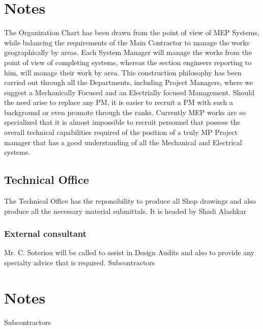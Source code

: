 \documentclass{article}
\begin{document}
\begin{minipage}[t]{.27\textwidth}
\section{Notes}

The Organization Chart has been drawn from the point of view of MEP Systems, while balancing the requirements of the Main Contractor to manage the works geographically by areas. Each System Manager will manage the works from the point of view of completing systems, whereas the section engineers reporting to him, will manage their work by area. 
This construction philosophy has been carried out through all the Departments, including Project Managers, where we suggest a Mechanically Focused and an Electrially focused Management.  Should the need arise to replace any PM, it is easier to recruit a PM with such a background or even promote through the ranks. Currently MEP works are so specialized that it is almost impossible to recruit personnel that possess the overall technical capabilities required of the position of a truly MP Project manager that has a good understanding of all the Mechanical and Electrical systems.

\subsection{Technical Office}
The Technical Office has the reponsibility to produce all Shop drawings and also produce all the necessary material submittals. It is headed by Shadi Alashkar

\subsubsection{External consultant}
\hbox{}

Mr. C. Soteriou will be called to assist in Design Audits and also to provide any specialty advice that is required.\label{externalconsultant}
Subcontractors \label{firesub}
\lipsum[5]

\end{minipage}\hfill
\begin{minipage}[t]{.27\textwidth}
\section{Notes}
Subcontractors \label{firesub}
\lipsum[1-2]
\end{minipage}\hspace{1cm}
\end{document}
